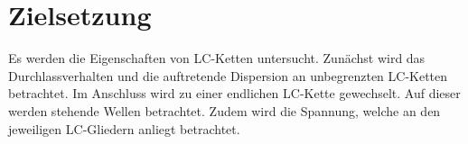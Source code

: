 
\section{Zielsetzung}
\label{sec:Zielsetzung}
Es werden die Eigenschaften von LC-Ketten untersucht. Zunächst wird das Durchlassverhalten und die auftretende Dispersion an unbegrenzten LC-Ketten betrachtet. Im Anschluss wird zu einer endlichen LC-Kette gewechselt. Auf dieser werden stehende Wellen betrachtet. Zudem wird die Spannung, welche an den jeweiligen LC-Gliedern anliegt betrachtet.